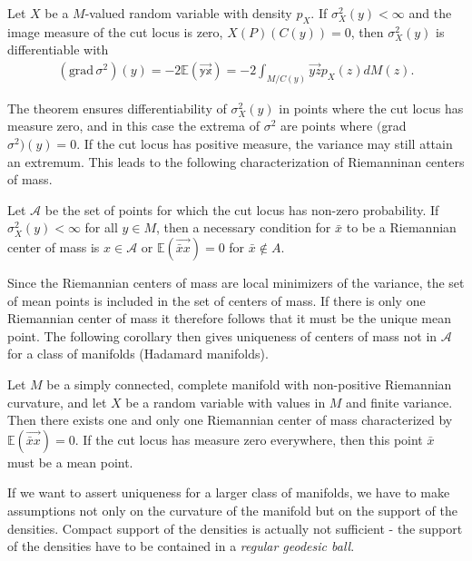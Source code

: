 \begin{theorem}
Let $X$ be a $M$-valued random variable with density $p_X$. If $\sigma^2_X(y) < \infty$ and the image measure of the cut locus is zero, $X(P)(C(y)) = 0$, then $\sigma^2_X(y)$ is differentiable with
\begin{align*}
(\text{grad} \, \sigma^2) (y) = -2 \mathbb{E(\overrightarrow{yx})} = - 2 \int_{M/C(y)} \overrightarrow{yz} p_X(z) d M(z).
\end{align*}
\end{theorem}

The theorem ensures differentiability of $\sigma^2_X(y)$ in points where the cut locus has measure zero, and in this case the extrema of $\sigma^2$ are points where $($grad $\sigma^2) (y) = 0$. If the cut locus has positive measure, the variance may still attain an extremum. This leads to the following characterization of Riemanninan centers of mass.

\begin{corollary}
Let $\mathcal{A}$ be the set of points for which the cut locus has non-zero probability. If $\sigma^2_X(y) < \infty$ for all $y \in M$, then a necessary condition for $\bar{x}$ to be a Riemannian center of mass is $x \in \mathcal{A}$ or $\mathbb{E}(\overrightarrow{\bar{x}x}) = 0$ for $\bar{x} \notin A$.
\end{corollary}

Since the Riemannian centers of mass are local minimizers of the variance, the set of mean points is included in the set of centers of mass. If there is only one Riemannian center of mass it therefore follows that it must be the unique mean point. The following corollary then gives uniqueness of centers of mass not in $\mathcal{A}$ for a class of manifolds (Hadamard manifolds).

\begin{corollary}
Let $M$ be a simply connected, complete manifold with non-positive Riemannian curvature, and let $X$ be a random variable with values in $M$ and finite variance. Then there exists one and only one Riemannian center of mass characterized by $\mathbb{E}(\overrightarrow{\bar{x}x}) = 0$. If the cut locus has measure zero everywhere, then this point $\bar{x}$ must be a mean point. 
\end{corollary}

If we want to assert uniqueness for a larger class of manifolds, we have to make assumptions not only on the curvature of the manifold but on the support of the densities. Compact support of the densities is actually not sufficient - the support of the densities have to be contained in a \textit{regular geodesic ball}. 

